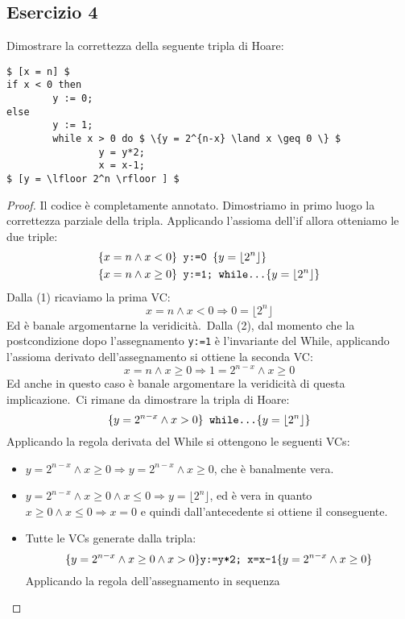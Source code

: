 \subsection{Esercizio 4}
Dimostrare la correttezza della seguente tripla di Hoare:
\begin{lstlisting}[mathescape, numberfirstline=false, frame=single]
$ [x = n] $
if x < 0 then
        y := 0;
else
        y := 1;
        while x > 0 do $ \{y = 2^{n-x} \land x \geq 0 \} $
                y = y*2;
                x = x-1;
$ [y = \lfloor 2^n \rfloor ] $
\end{lstlisting}

\begin{proof}
Il codice è completamente annotato. Dimostriamo in primo luogo la correttezza parziale della tripla. Applicando l'assioma dell'if allora otteniamo le due triple:
\begin{align}
& \{x=n \land x<0 \} \text{\texttt{ y:=0 }} \{y= \lfloor 2^n \rfloor \} \\
& \{x=n \land x \geq 0 \} \text{\texttt{ y:=1; while}} \texttt{\dots } \{ y= \lfloor 2^n \rfloor \}
\end{align}
Dalla (1) ricaviamo la prima VC:
\[ x = n \land x<0 \Rightarrow 0 = \lfloor 2^n \rfloor \]
Ed è banale argomentarne la veridicità.\
Dalla (2), dal momento che la postcondizione dopo l'assegnamento \texttt{y:=1} è l'invariante del While, applicando l'assioma derivato dell'assegnamento si ottiene la seconda VC:
\[ x=n \land x \geq 0 \Rightarrow 1 = 2^{n-x} \land x \geq 0 \]
Ed anche in questo caso è banale argomentare la veridicità di questa implicazione.\
Ci rimane da dimostrare la tripla di Hoare:
\[ \{ y=2^{n-x} \land x>0 \} \text{\texttt{ while}} \texttt{\dots } \{y= \lfloor 2^n \rfloor \} \]
Applicando la regola derivata del While si ottengono le seguenti VCs:
\begin{itemize}
  \item $ y=2^{n-x} \land x \geq 0 
        \Rightarrow y=2^{n-x} \land x \geq 0 $,
        che è banalmente vera.
  \item $ y=2^{n-x} \land x \geq 0 \land x \leq 0
        \Rightarrow y = \lfloor 2^n \rfloor $,
        ed è vera in quanto
        $ x \geq 0 \land x \leq 0\Rightarrow x = 0 $
        e quindi dall'antecedente si ottiene il conseguente.
  \item Tutte le VCs generate dalla tripla:
        \[ \{y=2^{n-x} \land x \geq 0 \land x>0 \}
        \text{\texttt{y:=y*2; x=x-1}}
        \{y=2^{n-x} \land x \geq 0 \} \]
        Applicando la regola dell'assegnamento in sequenza

\end{itemize}
\end{proof}
